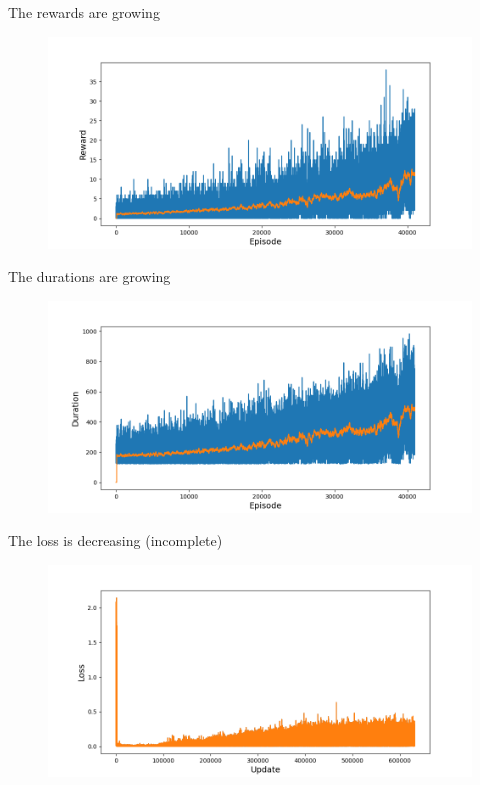 \documentclass[10pt, aspectratio=169, compress, protectframetitle, handout]{beamer}
\begin{document}
\begin{frame}{The rewards are growing}

    \begin{figure}
        \centering
        \includegraphics[width=\textwidth]{figures/rewards_02_41000.png}
    \end{figure}
    
\end{frame}


\begin{frame}{The durations are growing}

    \begin{figure}
        \centering
        \includegraphics[width=\textwidth]{figures/durations_02_41000.png}
    \end{figure}
    
\end{frame}


\begin{frame}{The loss is decreasing (incomplete)}

    \begin{figure}
        \centering
        \includegraphics[width=\textwidth]{figures/loss_02_OLD.png}
    \end{figure}
    
\end{frame}
\end{document}
